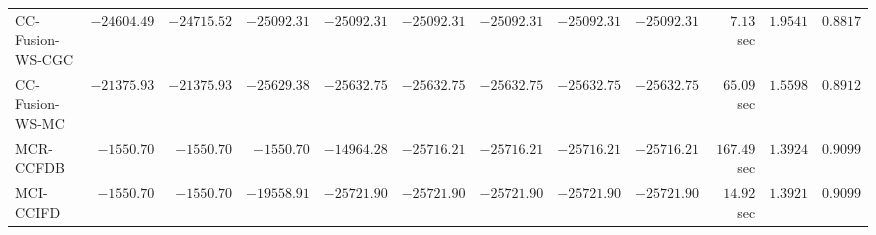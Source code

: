 \begin{table}[H]
\begin{tabular}{lrrrrrrrrrrr}
    CC-Fusion-WS-CGC & $    -24604.49$ & $    -24715.52$ & $    -25092.31$ & $    -25092.31$ & $    -25092.31$ & $    -25092.31$ & $    -25092.31$ & $    -25092.31$ & $         7.13$ sec    & $       1.9541$  & $       0.8817$ \\ 
     CC-Fusion-WS-MC & $    -21375.93$ & $    -21375.93$ & $    -25629.38$ & $    -25632.75$ & $    -25632.75$ & $    -25632.75$ & $    -25632.75$ & $    -25632.75$ & $        65.09$ sec    & $       1.5598$  & $       0.8912$ \\ 
\cmidrule{1-1} 
           MCR-CCFDB & $     -1550.70$ & $     -1550.70$ & $     -1550.70$ & $    -14964.28$ & $    -25716.21$ & $    -25716.21$ & $    -25716.21$ & $    -25716.21$ & $       167.49$ sec    & $       1.3924$  & $       0.9099$ \\ 
\cmidrule{1-1} 
           MCI-CCIFD & $     -1550.70$ & $     -1550.70$ & $    -19558.91$ & $    -25721.90$ & $    -25721.90$ & $    -25721.90$ & $    -25721.90$ & $    -25721.90$ & $        14.92$ sec    & $       1.3921$  & $       0.9099$ \\ 
\bottomrule
\end{tabular}
\end{table}

